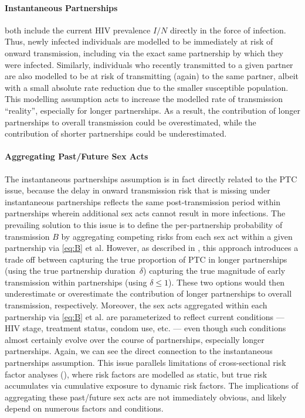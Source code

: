 \paragraph{Instantaneous Partnerships}
 both include
the current HIV prevalence $I/N$ directly in the force of infection.
Thus, newly infected individuals are modelled to be
immediately at risk of onward transmission,
including via the exact same partnership by which they were infected.
Similarly, individuals who recently transmitted to a given partner are also modelled to be
at risk of transmitting (again) to the same partner,
albeit with a small absolute rate reduction due to the smaller susceptible population.
This modelling assumption acts to increase the modelled rate of transmission \vs ``reality'',
especially for longer partnerships.
As a result, the contribution of longer partnerships to overall transmission could be overestimated,
while the contribution of shorter partnerships could be underestimated.
\paragraph{Aggregating Past/Future Sex Acts}
The instantaneous partnerships assumption is in fact directly related to the PTC issue,
because the delay in onward transmission risk that is missing under instantaneous partnerships
reflects the same post-transmission period within partnerships
wherein additional sex acts cannot result in more infections.
The prevailing solution to this issue is to
define the per-partnership probability of transmission $B$ by
aggregating competing risks from each sex act within a given partnership via \eqref{eq:B} et al.
However, as described in , this approach introduces a trade off between
capturing the true proportion of PTC in longer partnerships
(using the true partnership duration~$\delta$)
\vs capturing the true magnitude of early transmission within partnerships (using $\delta \le 1$).
These two options would then underestimate or overestimate
the contribution of longer partnerships to overall transmission, respectively.
Moreover, the sex acts aggregated within each partnership via \eqref{eq:B} et al.
are parameterized to reflect current conditions
--- \ie HIV stage, treatment status, condom use, etc. ---
even though such conditions almost certainly evolve over the course of partnerships,
especially longer partnerships.
Again, we can see the direct connection to the instantaneous partnerships assumption.
This issue parallels limitations of cross-sectional risk factor analyses
(\eg {}),
where risk factors are modelled as static,
but true risk accumulates via cumulative exposure to dynamic risk factors.
The implications of aggregating these past/future sex acts are not immediately obvious,
and likely depend on numerous factors and conditions.
